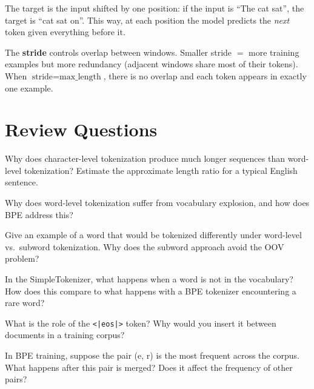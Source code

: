 \begin{keyconcept}
  The target is the input shifted by one position: if the input is
  ``The cat sat'', the target is ``cat sat on''. This way, at each
  position the model predicts the \emph{next} token given everything
  before it.

  The \textbf{stride} controls overlap between windows. Smaller stride
  $=$ more training examples but more redundancy (adjacent windows share
  most of their tokens). When $\text{stride} = \text{max\_length}$,
  there is no overlap and each token appears in exactly one example.
\end{keyconcept}

\section*{Review Questions}

\begin{reviewquestion}[1]
  Why does character-level tokenization produce much longer sequences than
  word-level tokenization? Estimate the approximate length ratio for a
  typical English sentence.
\end{reviewquestion}

\begin{reviewquestion}[2]
  Why does word-level tokenization suffer from vocabulary explosion, and
  how does BPE address this?
\end{reviewquestion}

\begin{reviewquestion}[3]
  Give an example of a word that would be tokenized differently under
  word-level vs.\ subword tokenization. Why does the subword approach
  avoid the OOV problem?
\end{reviewquestion}

\begin{reviewquestion}[4]
  In the SimpleTokenizer, what happens when a word is not in the
  vocabulary? How does this compare to what happens with a BPE tokenizer
  encountering a rare word?
\end{reviewquestion}

\begin{reviewquestion}[5]
  What is the role of the \texttt{<|eos|>} token? Why would you insert it
  between documents in a training corpus?
\end{reviewquestion}

\begin{reviewquestion}[6]
  In BPE training, suppose the pair (e, r) is the most frequent across the
  corpus. What happens after this pair is merged? Does it affect the
  frequency of other pairs?
\end{reviewquestion}

